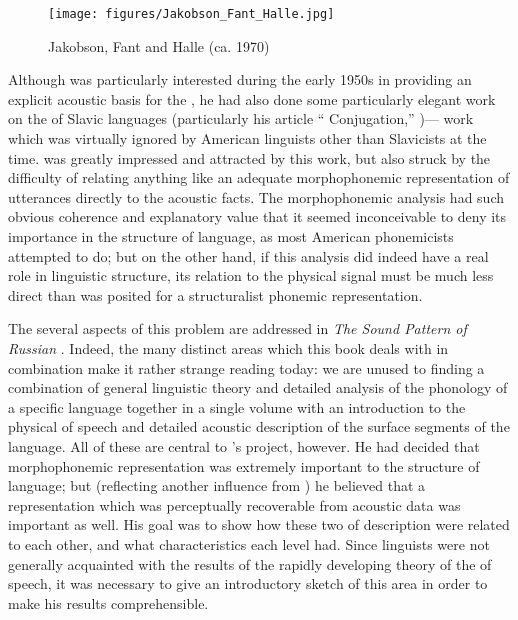 \begin{wrapfigure}[11]{r}{.45\textwidth}
  \texttt{[image: figures/Jakobson\_Fant\_Halle.jpg]}
  \caption{Jakobson, Fant and Halle (ca. 1970)}
  \label{fig:ch.genphon.jakobson_fant_halle}
\end{wrapfigure}
Although {\Jakobson} was particularly interested during the early 1950s
in providing an explicit acoustic basis for the ,
he had also done some particularly elegant work on the 
of Slavic languages (particularly his article `` Conjugation,''
\citealt{jakobson48:russian.conjugation})— work which was virtually
ignored by American linguists other than Slavicists at the time. {\Halle}
was greatly impressed and attracted by this work, but also struck by
the difficulty of relating anything like an adequate morphophonemic
representation of utterances directly to the acoustic facts. The
morphophonemic analysis had such obvious coherence and explanatory
value that it seemed inconceivable to deny its importance in the
structure of language, as most American phonemicists attempted to do;
but on the other hand, if this analysis did indeed have a real role in
linguistic structure, its relation to the physical signal must be much
less direct than was posited for a structuralist phonemic
representation.

The several aspects of this problem are addressed in \textsl{The Sound
  Pattern of Russian} \citep{halle:spr}. Indeed, the many distinct
areas which this book deals with in combination make it rather strange
reading today: we are unused to finding a combination of general
linguistic theory and detailed analysis of the phonology of a specific
language together in a single volume with an introduction to the
physical  of speech and detailed acoustic description of the
surface segments of the language. All of these are central to {\Halle}'s
project, however. He had decided that morphophonemic representation
was extremely important to the structure of language; but (reflecting
another influence from {\Jakobson}) he believed that a representation
which was perceptually recoverable from acoustic data was important as
well. His goal was to show how these two  of description were
related to each other, and what characteristics each level had. Since
linguists were not generally acquainted with the results of the
rapidly developing theory of the  of speech, it was necessary
to give an introductory sketch of this area in order to make his
results comprehensible.

